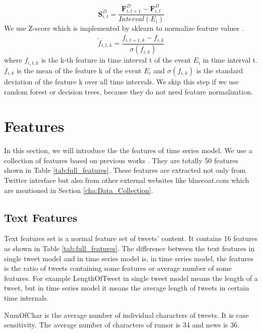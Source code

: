\begin{equation}
\textbf{S}^D_{i,t}=\frac{\textbf{F}^D_{i,t+1}-\textbf{F}^D_{i,t}}{Interval(E_i)}
\end{equation}
We use Z-score which is implemented by sklearn to normalize feature values .
\begin{equation}
\widetilde{f}_{i,t,k}=\frac{f_{i,t+1,k}-\overline{f}_{i,k}}{\sigma(f_{i,k})}
\end{equation}
where $f_{i,t,k}$ is the k-th feature in time interval t of the event $E_i$ in time interval t. $\overline{f}_{i,k}$ is the mean of the feature k of the event $E_i$ and $\sigma(f_{i,k})$ is the standard deviation of the feature k over all time intervals. We skip this step if we use random forest or decision trees, because they do not need feature normalization.

  \section{ Features} 
 
 In this section, we will introduce the the features of time series model. We use a collection of features based on previous works 
\cite{castillo2011information}\cite{gupta2014tweetcred} \cite{yang2012automatic}\cite{liu2015real}\cite{madetecting}\cite{ma2015detect} \cite{mendoza2010twitter}\cite{wu2015false}\cite{jin2013epidemiological}. They are totally 50 features shown in Table \ref{tab:full_features}. These features are extracted not only from Twitter interface but also from other external websites like bluecoat.com which are mentioned in Section \ref{cha:Data_Collection}. 
\subsection{Text Features}
Text features set is a normal feature set of tweets' content. It contains 16 features as shown in Table \ref{tab:full_features}. The difference between the text features in single tweet model and in time series model is, in time series model, the features is the ratio of tweets containing some features or average number of some features. For example LengthOfTweet in single tweet model means the length of a tweet, but in time series model it means the average length of tweets in certain time internals.  

NumOfChar is the average number of individual characters of tweets. It is case sensitivity. The average number of characters of rumor is 34 and news is 36.
